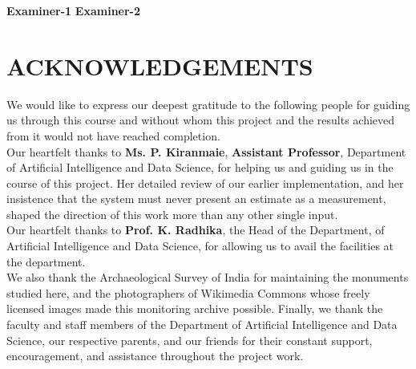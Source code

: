 \documentclass[a4paper,12pt,oneside]{book}
\newcommand{\thesisdept}{Artificial Intelligence and Data Science} %
\newcommand{\thesisguide}{Ms. P. Kiranmaie}
\newcommand{\thesisguidedesig}{Assistant Professor} %
\newcommand{\depthod}{Prof. K. Radhika} %
\begin{document}
\vspace{1.0cm}
\noindent
\textbf{Examiner-1} \hfill \textbf{Examiner-2}

\newpage

\clearpage
{}
{}
\chapter*{ACKNOWLEDGEMENTS}

\noindent
\fontsize{12pt}{18pt}\selectfont We would like to express our deepest gratitude to the following people for guiding us through this course and without whom this project and the results achieved from it would not have reached completion.\\

\noindent
Our heartfelt thanks to \textbf{\thesisguide}, \textbf{\thesisguidedesig}, Department of \thesisdept, for helping us and guiding us in the course of this project. Her detailed review of our earlier implementation, and her insistence that the system must never present an estimate as a measurement, shaped the direction of this work more than any other single input.\\

\noindent
Our heartfelt thanks to \textbf{\depthod}, the Head of the Department, of \thesisdept, for allowing us to avail the facilities at the department.\\

\noindent
We also thank the Archaeological Survey of India for maintaining the monuments studied here, and the photographers of Wikimedia Commons whose freely licensed images made this monitoring archive possible. Finally, we thank the faculty and staff members of the Department of Artificial Intelligence and Data Science, our respective parents, and our friends for their constant support, encouragement, and assistance throughout the project work.

\clearpage
{}
\onehalfspacing
{}
\tableofcontents

\clearpage
{}
\onehalfspacing
{}
\listoftables

\clearpage
{}
\onehalfspacing
{}
\listoffigures

\clearpage
{}
{}
\end{document}
